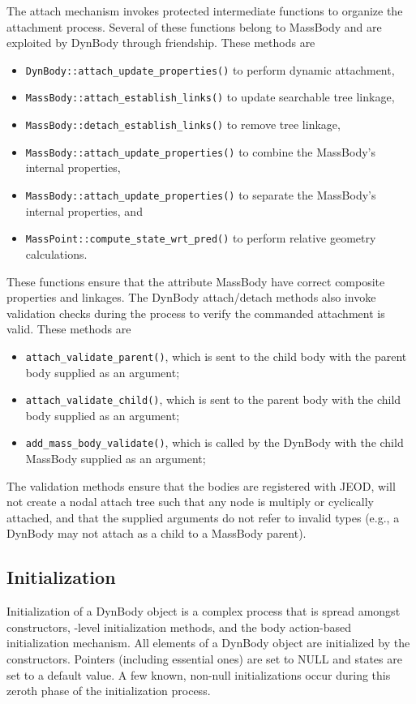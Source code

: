 The attach mechanism invokes protected intermediate functions to organize the 
attachment process. Several of these functions belong to MassBody and are
exploited by DynBody through friendship.
These methods are\begin{itemize}
\item \verb+DynBody::attach_update_properties()+ to perform dynamic attachment, 
\item \verb+MassBody::attach_establish_links()+ to update searchable tree linkage, 
\item \verb+MassBody::detach_establish_links()+ to remove tree linkage, 
\item \verb+MassBody::attach_update_properties()+ to combine the MassBody's internal
    properties, 
\item \verb+MassBody::attach_update_properties()+ to separate the MassBody's internal
    properties, and
\item \verb+MassPoint::compute_state_wrt_pred()+ to perform relative geometry 
    calculations. 
\end{itemize}
These functions ensure that the attribute MassBody have correct composite 
properties and linkages. The DynBody attach/detach methods also invoke 
validation checks during the process to verify the commanded attachment is 
valid.
These methods are\begin{itemize}
\item \verb+attach_validate_parent()+,
  which is sent to the child body with the parent body supplied as an argument;
\item \verb+attach_validate_child()+,
  which is sent to the parent body with the child body supplied as an argument;
\item \verb+add_mass_body_validate()+,
  which is called by the DynBody with the child MassBody supplied as an argument;
\end{itemize}
The validation methods ensure that the bodies are registered with JEOD, will 
not create a nodal attach tree such that any node is multiply or cyclically 
attached, and that the supplied arguments do not refer to invalid types (e.g., 
a DynBody may not attach as a child to a MassBody parent).

\subsection{Initialization}
Initialization of a DynBody object is a complex process that is spread amongst
constructors, \Sdefine-level initialization methods, and the body action-based
initialization mechanism. All elements of a DynBody object are initialized
by the constructors. Pointers (including essential ones) are set to NULL and
states are set to a default value. A few known, non-null initializations occur
during this zeroth phase of the initialization process.

